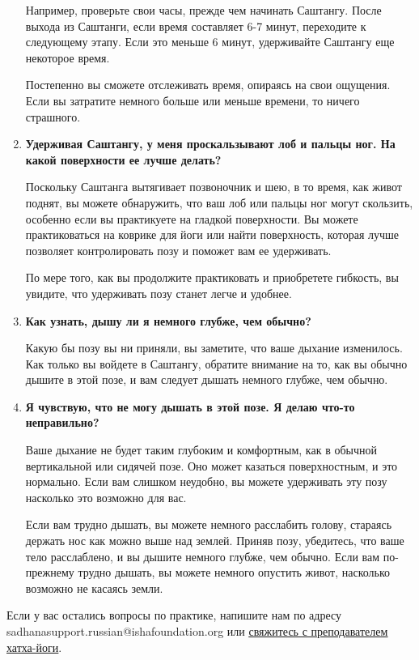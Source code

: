 \documentclass[
a4paper, %
12pt, %
article,
onecolumn, %
openany, %
]{memoir}
\let\oldhref\href
\renewcommand{\href}[2]{\oldhref{#1}{\underline{#2}}}
\begin{document}
\begin{enumerate}
Например, проверьте свои часы, прежде чем начинать Саштангу. После выхода из Саштанги, если время составляет 6-7 минут, переходите к следующему этапу. Если это меньше 6 минут, удерживайте Саштангу еще некоторое время.

Постепенно вы сможете отслеживать время, опираясь на свои ощущения. Если вы
затратите немного больше или меньше времени, то ничего страшного.

\item \textbf{Удерживая Саштангу, у меня проскальзывают лоб и пальцы ног. На какой
    поверхности ее лучше делать?}

Поскольку Саштанга вытягивает позвоночник и шею, в то время, как живот поднят, вы
можете обнаружить, что ваш лоб или пальцы ног могут скользить, особенно если вы
практикуете на гладкой поверхности. Вы можете практиковаться на коврике для йоги
или найти поверхность, которая лучше позволяет контролировать позу и поможет вам
ее удерживать.

По мере того, как вы продолжите практиковать и приобретете гибкость, вы увидите, что
удерживать позу станет легче и удобнее.
\item \textbf{Как узнать, дышу ли я немного глубже, чем обычно?}

Какую бы позу вы ни приняли, вы заметите, что ваше дыхание изменилось. Как только
вы войдете в Саштангу, обратите внимание на то, как вы обычно дышите в этой позе, и
вам следует дышать немного глубже, чем обычно.

\item \textbf{Я чувствую, что не могу дышать в этой позе. Я делаю что-то неправильно?}

Ваше дыхание не будет таким глубоким и комфортным, как в обычной вертикальной
или сидячей позе. Оно может казаться поверхностным, и это нормально. Если вам
слишком неудобно, вы можете удерживать эту позу насколько это возможно для вас.

Если вам трудно дышать, вы можете немного расслабить голову, стараясь держать нос
как можно выше над землей.
Приняв позу, убедитесь, что ваше тело расслаблено, и вы дышите немного глубже, чем
обычно.
Если вам по-прежнему трудно дышать, вы можете немного опустить живот, насколько
возможно не касаясь земли.

\end{enumerate}

Если у вас остались вопросы по практике, напишите нам по адресу \\ 
sadhanasupport.russian@ishafoundation.org или \href{https://isha.sadhguru.org/in/en/yoga-meditation/yoga-teacher-training/hatha-yoga-teacher-training/teachers-in-your-area}{свяжитесь с преподавателем хатха-йоги}.
\end{document}

